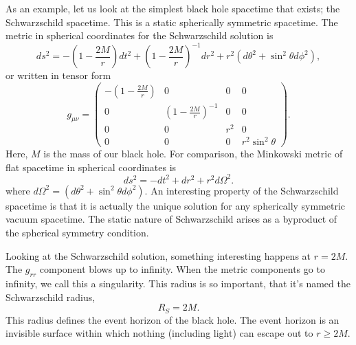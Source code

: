 \begin{bibunit}[unsrtnat]
As an example, let us look at the simplest black hole spacetime that exists; the
Schwarzschild spacetime. This is a static spherically symmetric spacetime. The
metric in spherical coordinates for the Schwarzschild solution is
\begin{equation}
   ds^2 = -\left(1-\frac{2M}{r}\right)dt^2 + \left(1-\frac{2M}{r}\right)^{-1}dr^2
      + r^2\left(d\theta^2 + \sin^2\theta d\phi^2\right),
\end{equation}
or written in tensor form
\begin{equation}
   g_{\mu\nu} = \left(
   \begin{matrix}
      -\left(1-\frac{2M}{r}\right) & 0 & 0 & 0 \\
      0 & \left(1-\frac{2M}{r}\right)^{-1} & 0 & 0 \\
      0 & 0 & r^2 & 0 \\
      0 & 0 & 0 & r^2\sin^2\theta
   \end{matrix}
   \right) .
\end{equation}
Here, $M$ is the mass of our black hole. For comparison, the Minkowski metric of
flat spacetime in spherical coordinates is
\begin{equation}
   ds^2 = -dt^2 + dr^2 + r^2d\Omega^2.
\end{equation}
where $d\Omega^2=\left(d\theta^2 + \sin^2\theta d\phi^2\right)$. An interesting
property of the Schwarzschild spacetime is that it is actually the unique
solution for any spherically symmetric vacuum spacetime. The static nature of
Schwarzschild arises as a byproduct of the spherical symmetry condition.

Looking at the Schwarzschild solution, something interesting happens at $r=2M$.
The $g_{rr}$ component blows up to infinity. When the metric components go to
infinity, we call this a singularity. This radius is so important, that it's
named the Schwarzschild radius,
\begin{equation}
   R_S = 2M.
\end{equation}
This radius defines the event horizon of the black hole. The event horizon is an
invisible surface within which nothing (including light) can escape out to
$r\geq2M$.


\end{bibunit}
